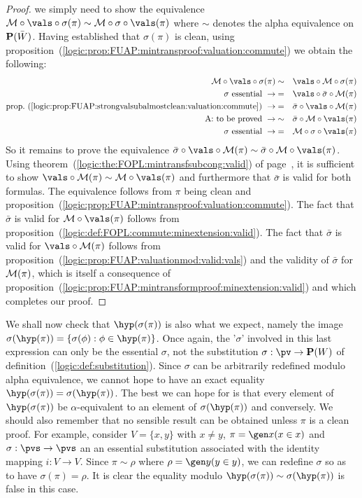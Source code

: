 \begin{proof}
we simply need to show the equivalence ${\cal
M}\circ\vals\circ\sigma(\pi)\sim{\cal M}\circ\sigma\circ\vals(\pi)$
where $\sim$ denotes the alpha equivalence on ${\bf
P}(\bar{W})$. Having established that $\sigma(\pi)$ is clean, using
proposition~(\ref{logic:prop:FUAP:mintransproof:valuation:commute})
we obtain the following:
    \begin{eqnarray*}
    {\cal M}\circ\vals\circ\sigma(\pi)&\sim&\vals\circ{\cal
    M}\circ\sigma(\pi)\\
    \mbox{$\sigma$ essential}\ \rightarrow
    &=&\vals\circ\bar{\sigma}\circ{\cal M}(\pi)\\
    \mbox{prop.~(\ref{logic:prop:FUAP:strongvalsubalmostclean:valuation:commute})}\ \rightarrow
    &=&\bar{\sigma}\circ\vals\circ{\cal M}(\pi)\\
    \mbox{A: to be proved}\ \rightarrow
    &\sim&\bar{\sigma}\circ{\cal M}\circ\vals(\pi)\\
    \mbox{$\sigma$ essential}\ \rightarrow
    &=&{\cal M}\circ\sigma\circ\vals(\pi)\\
    \end{eqnarray*}
So it remains to prove the equivalence
$\bar{\sigma}\circ\vals\circ{\cal M}(\pi)\sim\bar{\sigma}\circ{\cal
M}\circ\vals(\pi)$. Using
theorem~(\ref{logic:the:FOPL:mintransfsubcong:valid}) of
page~\pageref{logic:the:FOPL:mintransfsubcong:valid}, it is
sufficient to show $\vals\circ{\cal M}(\pi)\sim{\cal
M}\circ\vals(\pi)$ and furthermore that $\bar{\sigma}$ is valid for
both formulas. The equivalence follows from $\pi$ being clean and
proposition~(\ref{logic:prop:FUAP:mintransproof:valuation:commute}).
The fact that $\bar{\sigma}$ is valid for ${\cal M}\circ\vals(\pi)$
follows from
proposition~(\ref{logic:def:FOPL:commute:minextension:valid}). The
fact that $\bar{\sigma}$ is valid for $\vals\circ{\cal M}(\pi)$
follows from
proposition~(\ref{logic:prop:FUAP:valuationmod:valid:vals}) and the
validity of $\bar{\sigma}$ for ${\cal M}(\pi)$, which is itself a
consequence of
proposition~(\ref{logic:prop:FUAP:mintransformproof:minextension:valid})
and which completes our proof.
\end{proof}

We shall now check that $\hyp(\sigma(\pi))$ is also what we expect,
namely the image
$\sigma(\hyp(\pi))=\{\sigma(\phi):\phi\in\hyp(\pi)\}$. Once again,
the '$\sigma$' involved in this last expression can only be the
essential $\sigma$, not the substitution $\sigma:\pv\to{\bf P}(W)$
of definition~(\ref{logic:def:substitution}). Since $\sigma$ can be
arbitrarily redefined modulo alpha equivalence, we cannot
hope to have an exact equality
$\hyp(\sigma(\pi))=\sigma(\hyp(\pi))$. The best we can hope for is
that every element of $\hyp(\sigma(\pi))$ be $\alpha$-equivalent to
an element of $\sigma(\hyp(\pi))$ and conversely. We should also
remember that no sensible result can be obtained unless $\pi$ is a
clean proof. For example, consider $V=\{x,y\}$ with $x\neq y$,
$\pi=\gen x(x\in x)$ and $\sigma:\pvs\to\pvs$ an an essential
substitution associated with the identity mapping $i:V\to V$. Since
$\pi\sim\rho$ where $\rho=\gen y(y\in y)$, we can redefine $\sigma$
so as to have $\sigma(\pi)=\rho$. It is clear the equality modulo
$\hyp(\sigma(\pi))\sim\sigma(\hyp(\pi))$ is false in this case.

